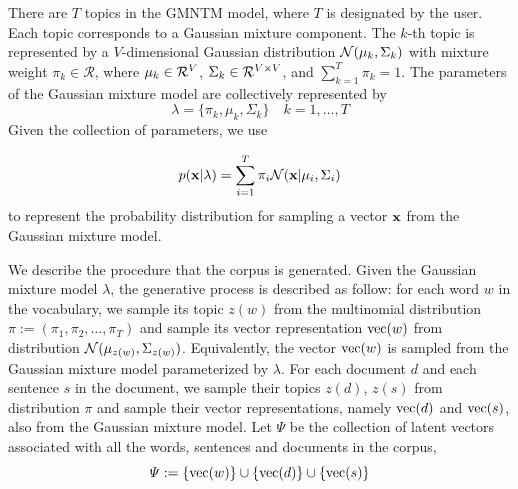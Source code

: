 \documentclass[english,letter]{article}
\renewcommand\[{\begin{equation}}
\renewcommand\]{\end{equation}}
\begin{document}
There are $T$ topics in the GMNTM model, where $T$ is designated
by the user. Each topic corresponds to a Gaussian mixture component.
The $k$-th topic is represented by a $V$-dimensional Gaussian distribution
${\cal N}(\mu_{k},\Sigma_{k})$ with mixture weight $\pi_{k}\in\mathcal{R}$,
where $\mu_{k}\in{\cal R}^{V}$, $\Sigma_{k}\in{\cal R}^{V\times V}$,
and $\sum_{k=1}^{T}\pi_{k}=1$. The parameters of the Gaussian mixture
model are collectively represented by
\[
\lambda=\{\pi_{k},\mu_{k},\Sigma_{k}\}\quad k=1,\ldots,T
\]
Given the collection of parameters, we use

\begin{equation}
p({\bf x}|\lambda)=\sum_{i=1}^{T}\pi_{i}{\cal N}({\bf x}|\mu_{i},\Sigma_{i})\label{eq:gmm-specification}
\end{equation}
to represent the probability distribution for sampling a vector ${\bf x}$
from the Gaussian mixture model.

We describe the procedure that the corpus is generated. Given the
Gaussian mixture model $\lambda$, the generative process  is described
as follow: for each word $w$ in the vocabulary, we sample its topic
$z(w)$ from the multinomial distribution $\pi:=(\pi_{1},\pi_{2},\dots,\pi_{T})$
and sample its vector representation ${\rm vec}(w)$ from distribution
${\cal N}(\mu_{z(w)},\Sigma_{z(w)})$. Equivalently, the vector ${\rm vec}(w)$
is sampled from the Gaussian mixture model parameterized by $\lambda$.
For each document $d$ and each sentence $s$ in the document, we
sample their topics $z(d)$, $z(s)$ from distribution $\pi$ and
sample their vector representations, namely ${\rm vec}(d)$ and ${\rm vec}(s)$,
also from the Gaussian mixture model. Let $\varPsi$ be the collection
of latent vectors associated with all the words, sentences and documents
in the corpus,
\[
\varPsi:=\left\{ {\rm vec}(w)\right\} \cup\left\{ {\rm vec}(d)\right\} \cup\left\{ {\rm vec}(s)\right\}
\]
\end{document}
